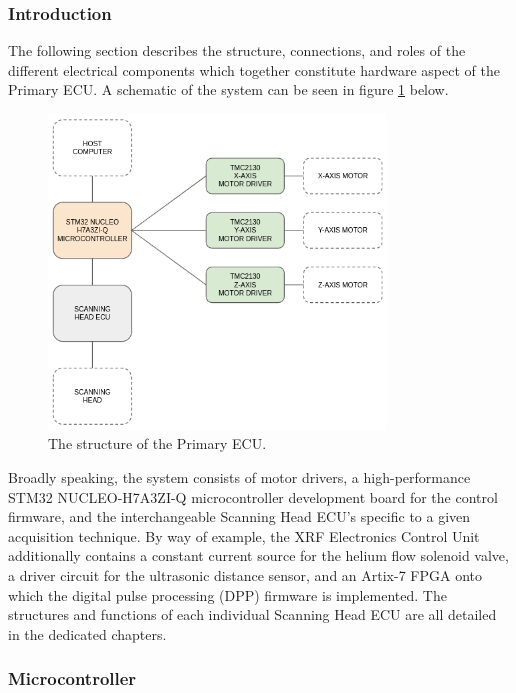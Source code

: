 \subsubsection{Introduction}

The following section describes the structure, connections, and roles of the different electrical components which together constitute hardware aspect of the Primary ECU. A schematic of the system can be seen in figure \ref{fig:ECU} below. 

\begin{figure}
\centering
\includegraphics[width=0.8\textwidth]{Primary-ECU/figs/ECU-overview.png}
\caption{\label{fig:ECU}The structure of the Primary ECU.}
\end{figure}

Broadly speaking, the system consists of motor drivers, a high-performance STM32 NUCLEO-H7A3ZI-Q microcontroller development board for the control firmware, and the interchangeable Scanning Head ECU’s specific to a given acquisition technique. By way of example, the XRF Electronics Control Unit additionally contains a constant current source for the helium flow solenoid valve, a driver circuit for the ultrasonic distance sensor, and an Artix-7 FPGA onto which the digital pulse processing (DPP) firmware is implemented. The structures and functions of each individual Scanning Head ECU are all detailed in the dedicated chapters.

\subsubsection{Microcontroller}

